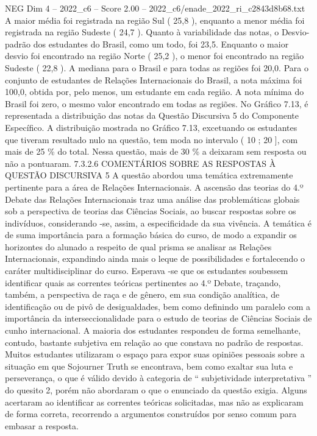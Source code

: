 \begin{textsample}{NEG Dim 4 – 2022\_c6 – Score 2.00 – 2022\_c6/enade\_2022\_ri\_c2843d8b68.txt}
A maior média foi registrada na região Sul ( 25,8 ), enquanto a menor média foi registrada na região Sudeste ( 24,7 ).
Quanto à variabilidade das notas, o Desvio-padrão dos estudantes do Brasil, como um todo, foi 23,5.
Enquanto o maior desvio foi encontrado na região Norte ( 25,2 ), o menor foi encontrado na região Sudeste ( 22,8 ).
A mediana para o Brasil e para todas as regiões foi 20,0.
Para o conjunto de estudantes de Relações Internacionais do Brasil, a nota máxima foi 100,0, obtida por, pelo menos, um estudante em cada região.
A nota mínima do Brasil foi zero, o mesmo valor encontrado em todas as regiões.
No Gráfico 7.13, é representada a distribuição das notas da Questão Discursiva 5 do Componente Específico.
A distribuição mostrada no Gráfico 7.13, excetuando os estudantes que tiveram resultado nulo na questão, tem moda no intervalo ( 10 ; 20 ], com mais de 25 \% do total.
Nessa questão, mais de 30 \% a deixaram sem resposta ou não a pontuaram. 7.3.2.6 COMENTÁRIOS SOBRE AS RESPOSTAS À QUESTÃO DISCURSIVA 5 A questão abordou uma temática extremamente pertinente para a área de Relações Internacionais.
A ascensão das teorias do 4.º Debate das Relações Internacionais traz uma análise das problemáticas globais sob a perspectiva de teorias das Ciências Sociais, ao buscar respostas sobre os indivíduos, considerando -se, assim, a especificidade da sua vivência.
A temática é de suma importância para a formação básica do curso, de modo a expandir os horizontes do alunado a respeito de qual prisma se analisar as Relações Internacionais, expandindo ainda mais o leque de possibilidades e fortalecendo o caráter multidisciplinar do curso.
Esperava -se que os estudantes soubessem identificar quais as correntes teóricas pertinentes ao 4.º Debate, traçando, também, a perspectiva de raça e de gênero, em sua condição analítica, de identificação ou de pivô de desigualdades, bem como definindo um paralelo com a importância da interseccionalidade para o estudo de teorias de Ciências Sociais de cunho internacional.
A maioria dos estudantes respondeu de forma semelhante, contudo, bastante subjetiva em relação ao que constava no padrão de respostas.
Muitos estudantes utilizaram o espaço para expor suas opiniões pessoais sobre a situação em que Sojourner Truth se encontrava, bem como exaltar sua luta e perseverança, o que é válido devido à categoria de “ subjetividade interpretativa ” do quesito 2, porém não abordaram o que o enunciado da questão exigia.
Alguns acertaram ao identificar as correntes teóricas solicitadas, mas não as explicaram de forma correta, recorrendo a argumentos construídos por senso comum para embasar a resposta.

\end{textsample}
